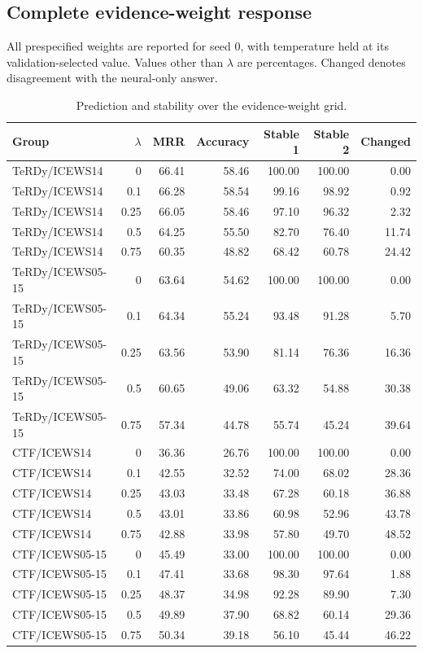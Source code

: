 \subsection{Complete evidence-weight response}
All prespecified weights are reported for seed 0, with temperature held at its validation-selected value. Values other than $\lambda$ are percentages. Changed denotes disagreement with the neural-only answer.
\small\begin{longtable}{lrrrrrr}\caption{Prediction and stability over the evidence-weight grid.}\\\toprule Group & $\lambda$ & MRR & Accuracy & Stable 1 & Stable 2 & Changed\\\midrule\endhead
TeRDy/ICEWS14 & 0 & 66.41 & 58.46 & 100.00 & 100.00 & 0.00\\
TeRDy/ICEWS14 & 0.1 & 66.28 & 58.54 & 99.16 & 98.92 & 0.92\\
TeRDy/ICEWS14 & 0.25 & 66.05 & 58.46 & 97.10 & 96.32 & 2.32\\
TeRDy/ICEWS14 & 0.5 & 64.25 & 55.50 & 82.70 & 76.40 & 11.74\\
TeRDy/ICEWS14 & 0.75 & 60.35 & 48.82 & 68.42 & 60.78 & 24.42\\
TeRDy/ICEWS05-15 & 0 & 63.64 & 54.62 & 100.00 & 100.00 & 0.00\\
TeRDy/ICEWS05-15 & 0.1 & 64.34 & 55.24 & 93.48 & 91.28 & 5.70\\
TeRDy/ICEWS05-15 & 0.25 & 63.56 & 53.90 & 81.14 & 76.36 & 16.36\\
TeRDy/ICEWS05-15 & 0.5 & 60.65 & 49.06 & 63.32 & 54.88 & 30.38\\
TeRDy/ICEWS05-15 & 0.75 & 57.34 & 44.78 & 55.74 & 45.24 & 39.64\\
CTF/ICEWS14 & 0 & 36.36 & 26.76 & 100.00 & 100.00 & 0.00\\
CTF/ICEWS14 & 0.1 & 42.55 & 32.52 & 74.00 & 68.02 & 28.36\\
CTF/ICEWS14 & 0.25 & 43.03 & 33.48 & 67.28 & 60.18 & 36.88\\
CTF/ICEWS14 & 0.5 & 43.01 & 33.86 & 60.98 & 52.96 & 43.78\\
CTF/ICEWS14 & 0.75 & 42.88 & 33.98 & 57.80 & 49.70 & 48.52\\
CTF/ICEWS05-15 & 0 & 45.49 & 33.00 & 100.00 & 100.00 & 0.00\\
CTF/ICEWS05-15 & 0.1 & 47.41 & 33.68 & 98.30 & 97.64 & 1.88\\
CTF/ICEWS05-15 & 0.25 & 48.37 & 34.98 & 92.28 & 89.90 & 7.30\\
CTF/ICEWS05-15 & 0.5 & 49.89 & 37.90 & 68.82 & 60.14 & 29.36\\
CTF/ICEWS05-15 & 0.75 & 50.34 & 39.18 & 56.10 & 45.44 & 46.22\\
\bottomrule\end{longtable}\normalsize
